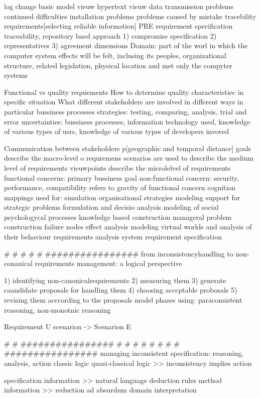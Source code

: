 log change
basic model vieuw
hypertext vieuw
data transmission problems
continued difficulties
installation problems
problems caused by mistake
tracebility requirements[selecting reliable information]
PRE requirement specification traceability, repository baed approach
1) compromise specification
2) representatives
3) agreement dimensions
Domain: part of the worl in which the computer system effects will be felt, inclusing its peoples, organizational structure, related legislation, physical location and met only the compyter systems

Functional vs quality requiements
How to determine quality characteristiec in specific situation
What different stakeholders are involved in different ways in particular bussiness processes
strategies: testing, comparing, analysis, trial and error
uncertainties: bussiness processes, information technology used, knowledge of various types of usrs, knowledge of various types of developers invoved

Communication between stakeholders p[geographic and temporal distance]
goals describe the macro-level o requremens
scenarios are used to describe the medium level of requirements vieuwpoints describe the microlelvel of requirements
functional concerns:  primary bussiness goal
non-functional concern: security, performance, compatibility refers to gravity of functional concern
cognition mappings used for:
simulation
organisational strategies modeling
support for strategic problems
formulation and decisio analysis
modeling of social psychologycal processes
knowledge based construction
manageral problem construction
failure nodes effect analysis
modeling virtual worlds and analysis of their behaviour
requirements analysis
system requirement  specification


# # #
# # ################
from inconsistencyhandling to non-conanical requirements management: a logical perspective

1) identifying non-canonicalrequirements
2) measuring them
3) generate caandidate proposals for handling them
4) choosing acccptable probosals
5) revising them acccording to the proposals
model phases using: paraconsistent reasoning, non-monotnic reasoning

Requirement U scenarion -> Scenarion E


# # ################
# # #
# # #
# # ################
managing inconsistent specification: reasoning, analysis, action
classic logic
quasi-classical logic >> inconsistency implies action

specification information >> natural language deduction rules
method information >> reduction ad absurdum
domain interpretation


